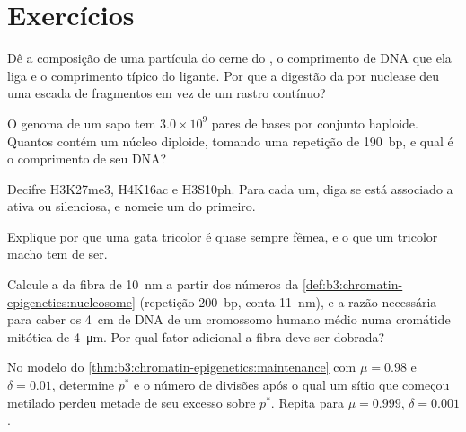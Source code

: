 \section{Exercícios}

\begin{exercise}[$\star$]\label{exo:b3:chromatin-epigenetics:1}
Dê a composição de uma partícula do cerne do , o
comprimento de DNA que ela liga e o comprimento típico do ligante. Por
que a digestão da  por nuclease deu uma escada de fragmentos
em vez de um rastro contínuo?
\end{exercise}

\begin{exercise}[$\star$]\label{exo:b3:chromatin-epigenetics:2}
O genoma de um sapo tem $3.0\times 10^{9}$ pares de bases por conjunto
haploide. Quantos  contém um núcleo diploide, tomando uma
repetição de \qty{190}{bp}, e qual é o comprimento de seu DNA?
\end{exercise}

\begin{exercise}[$\star$]\label{exo:b3:chromatin-epigenetics:3}
Decifre H3K27me3, H4K16ac e H3S10ph. Para cada um, diga se está
associado a  ativa ou silenciosa, e nomeie um  do
primeiro.
\end{exercise}

\begin{exercise}[$\star$]\label{exo:b3:chromatin-epigenetics:4}
Explique por que uma gata tricolor é quase sempre fêmea, e o que um
tricolor macho tem de ser.
\end{exercise}

\begin{exercise}[$\star\star$]\label{exo:b3:chromatin-epigenetics:5}
Calcule a  da fibra de \qty{10}{nm} a partir dos
números da \cref{def:b3:chromatin-epigenetics:nucleosome} (repetição
\qty{200}{bp}, conta \qty{11}{nm}), e a razão necessária para caber os
\qty{4}{cm} de DNA de um cromossomo humano médio numa cromátide
mitótica de \qty{4}{\micro m}. Por qual fator adicional a fibra deve
ser dobrada?
\end{exercise}

\begin{exercise}[$\star\star$]\label{exo:b3:chromatin-epigenetics:6}
No modelo do \cref{thm:b3:chromatin-epigenetics:maintenance} com
$\mu = 0.98$ e $\delta = 0.01$, determine $p^{*}$ e o número de
divisões após o qual um sítio que começou metilado perdeu metade de
seu excesso sobre $p^{*}$. Repita para $\mu = 0.999$, $\delta = 0.001$.
\end{exercise}

